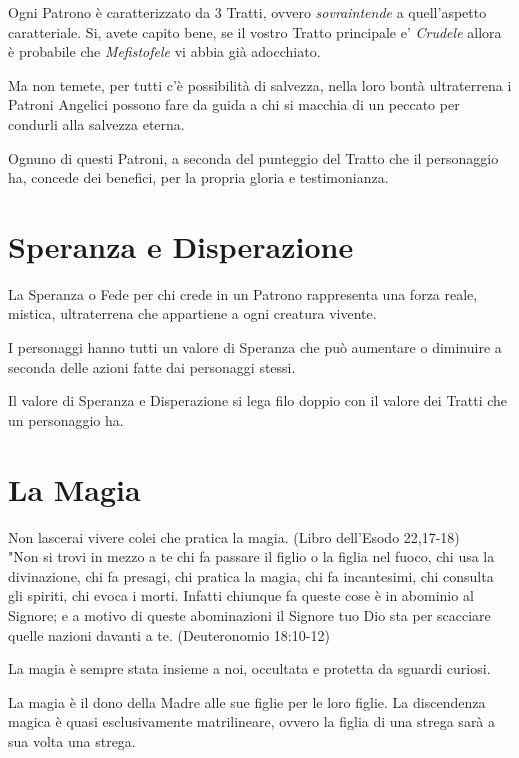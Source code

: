\documentclass[a4paper,twoside,openany]{book}
\begin{document}
\begin{multicols}{2}
Ogni Patrono è caratterizzato da 3 Tratti, ovvero \emph{sovraintende} a quell'aspetto caratteriale. Si, avete capito bene, se il vostro Tratto principale e' \emph{Crudele} allora è probabile che \emph{Mefistofele} vi abbia già adocchiato.

Ma non temete, per tutti c'è possibilità di salvezza, nella loro bontà ultraterrena i Patroni Angelici possono fare da guida a chi si macchia di un peccato per condurli alla salvezza eterna.

Ognuno di questi Patroni, a seconda del punteggio del Tratto che il personaggio ha, concede dei benefici, per la propria gloria e testimonianza.


\section{Speranza e Disperazione}

La Speranza o Fede per chi crede in un Patrono rappresenta una forza reale, mistica, ultraterrena che appartiene a ogni creatura vivente.

I personaggi hanno tutti un valore di Speranza che può aumentare o diminuire a seconda delle azioni fatte dai personaggi stessi.

Il valore di Speranza e Disperazione si lega filo doppio con il valore dei Tratti che un personaggio ha.


\section{La Magia}

\begin{changemargin}{0.3cm}{0.3cm}\begin{enfasi}{
Non lascerai vivere colei che pratica la magia. (Libro dell'Esodo 22,17-18)\\

"Non si trovi in mezzo a te chi fa passare il figlio o la figlia nel fuoco, chi usa la divinazione, chi fa presagi, chi pratica la magia, chi fa incantesimi, chi consulta gli spiriti, chi evoca i morti. Infatti chiunque fa queste cose è in abominio al Signore; e a motivo di queste abominazioni il Signore tuo Dio sta per scacciare quelle nazioni davanti a te. (Deuteronomio 18:10-12)
} \end{enfasi}\end{changemargin}

La magia è sempre stata insieme a noi, occultata e protetta da sguardi curiosi.

La magia è il dono della Madre alle sue figlie per le loro figlie.
La discendenza magica è quasi esclusivamente matrilineare, ovvero la figlia di una strega sarà a sua volta una strega.


\end{multicols}
\end{document}
